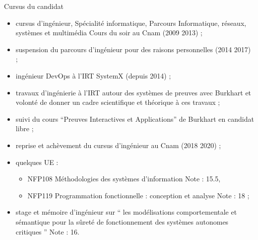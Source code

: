 \documentclass[
  hyperref={
    pdfusetitle,
    pdfencoding=auto,
    psdextra,
    colorlinks=true,
    linkcolor=darkblue,
    citecolor=darkred,
    urlcolor=darkblue,
  },
  9pt,
  aspectratio=169,
]{beamer}
\begin{document}
\begin{frame}{Cursus du candidat}
  \begin{itemize}
    \item
      cursus d'ingénieur, Spécialité informatique,
      Parcours Informatique, réseaux, systèmes et multimédia
      \textemdash{} Cours du soir au Cnam (2009 \textendash{} 2013) ;
    \item
      suspension du parcours d'ingénieur pour des raisons personnelles
      (2014 \textendash{} 2017) ;
    \item
      ingénieur DevOps à l'\gls{IRT} SystemX (depuis 2014) ;
    \item
      travaux d'ingénierie à l'\gls{IRT}
      autour des systèmes de preuves avec Burkhart 
      et volonté de donner un cadre scientifique et théorique à ces travaux ;
    \item
      suivi du cours \enquote{Preuves Interactives et Applications}
      de Burkhart  en candidat libre ;
    \item
      reprise et achèvement du cursus d'ingénieur au Cnam
      (2018 \textendash{} 2020) ;
    \item
      quelques UE :
      \begin{itemize}
        \item
          NFP108 \textendash{} Méthodologies des systèmes d'information
          \textendash{} Note : 15.5,
        \item
          NFP119 \textendash{} Programmation fonctionnelle :
          conception et analyse \textendash{} Note : 18 ;
      \end{itemize}
    \item
      stage et mémoire d'ingénieur sur
      \enquote{%
        les modélisations comportementale et sémantique pour
        la sûreté de fonctionnement des systèmes autonomes critiques%
      } \textendash{} Note  : 16.
  \end{itemize}
\end{frame}
\end{document}
